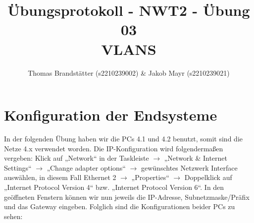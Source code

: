\documentclass{article}
\title{Übungsprotokoll - NWT2 - Übung 03 \\ VLANS}
\author{\vspace{0.5cm} Thomas Brandstätter (s2210239002) \& Jakob Mayr (s2210239021)}
\begin{document}
\maketitle

\section{Konfiguration der Endsysteme}

In der folgenden Übung haben wir die PCs 4.1 und 4.2 benutzt, somit sind die Netze 4.x verwendet worden. Die IP-Konfiguration wird folgendermaßen vergeben: Klick auf „Network“ in der Taskleiste $\rightarrow$ „Network \& Internet Settings“ $\rightarrow$ „Change adapter options“ $\rightarrow$ gewünschtes Netzwerk Interface auswählen, in diesem Fall Ethernet 2 $\rightarrow$ „Properties“ $\rightarrow$ Doppelklick auf „Internet Protocol Version 4“ bzw. „Internet Protocol Version 6“. In den geöffneten Fenstern können wir nun jeweils die IP-Adresse, Subnetzmaske/Präfix und das Gateway eingeben. Folglich sind die Konfigurationen beider PCs zu sehen:
\end{document}
